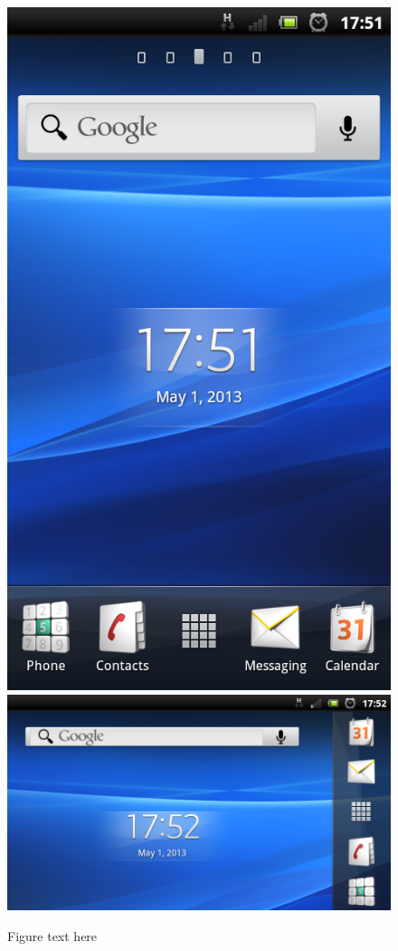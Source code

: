 \begin{figure}[t]
	\centering
    	\includegraphics[scale=0.20]{context_awareness/screenshot_2013-05-01_1751.png}
    	\includegraphics[scale=0.20]{context_awareness/screenshot_2013-05-01_1752.png}
		\caption{Figure text here} 
\end{figure}
	
